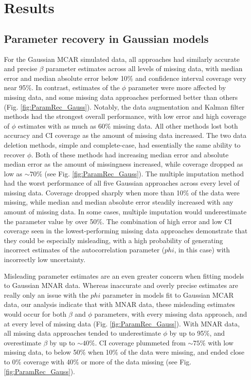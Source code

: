 \documentclass{article}
\begin{document}

\section*{Results}

\subsection*{Parameter recovery in Gaussian models}

For the Gaussian MCAR simulated data, all approaches had similarly accurate and precise $\beta$ parameter estimates across all levels of missing data, with median error and median absolute error below 10\% and confidence interval coverage very near 95\%. In contrast, estimates of the $\phi$ parameter were more affected by missing data, and some missing data approaches performed better than others (Fig. \ref{fig:ParamRec_Gauss}). Notably, the data augmentation and Kalman filter methods had the strongest overall performance, with low error and high coverage of $\phi$ estimates with as much as 60\% missing data. All other methods lost both accuracy and CI coverage as the amount of missing data increased. The two data deletion methods, simple and complete-case, had essentially the same ability to recover $\phi$. Both of these methods had increasing median error and absolute median error as the amount of missingness increased, while coverage dropped as low as $\sim70\%$ (see Fig. \ref{fig:ParamRec_Gauss}). The multiple imputation method had the worst performance of all five Gaussian approaches across every level of missing data. Coverage dropped sharply when more than 10\% of the data were missing, while median and median absolute error steadily increased with any amount of missing data. In some cases, multiple imputation would underestimate the parameter value by over 50\%. The combination of high error and low CI coverage seen in the lowest-performing missing data approaches demonstrate that they could be especially misleading, with a high probability of generating incorrect estimates of the autocorrelation parameter ($phi$, in this case) with incorrectly low  uncertainty. 

Misleading parameter estimates are an even greater concern when fitting models to Gaussian MNAR data.  Whereas inaccurate and overly precise estimates are really only an issue with the $phi$ parameter in models fit to Gaussian MCAR data, our analysis indicate that with MNAR data, these misleading estimates would occur for both $\beta$ and $\phi$ parameters, with every missing data approach, and at every level of missing data (Fig. \ref{fig:ParamRec_Gauss}). With MNAR data, all missing data approaches tended to underestimate $\phi$ by up to 95\%, and overestimate $\beta$ by up to $\sim40\%$.  CI coverage plummeted from $\sim75\%$ with low missing data, to below 50\% when 10\% of the data were missing, and ended close to 0\% coverage with 40\% or more of the data missing (see Fig. \ref{fig:ParamRec_Gauss}). 
\end{document}
